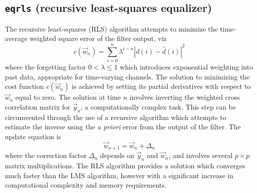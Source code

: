 \subsection{{\tt eqrls} (recursive least-squares equalizer)}
\label{module:equalization:eqrls}
The recursive least-squares (RLS) algorithm attempts to minimize the
time-average weighted square error of the filter output, viz
\begin{equation}
    c(\vec{w}_n) = \sum\limits_{i=0}^{n}{ \lambda^{i-n} \left| d(i)-\hat{d}(i)\right|^2 }
\end{equation}
where the forgetting factor $0<\lambda\leq 1$ which introduces
exponential weighting into past data, appropriate for time-varying
channels.
The solution to minimizing the cost function $c(\vec{w}_n)$ is achieved by
setting its partial derivatives with respect to $\vec{w}_n$ equal to zero.
The solution at time $n$ involves inverting the weighted cross correlation
matrix for $\vec{y}_n$, a computationally complex task.
This step can be circumvented through the use of a recursive algorithm which
attempts to estimate the inverse using the {\it a priori} error from the
output of the filter.
The update equation is
%
\begin{equation}
\label{eqn:equalization:rls_update}
    \vec{w}_{n+1} = \vec{w}_n + \Delta_{n}
\end{equation}
%
where the correction factor $\Delta_{n}$ depends on $\vec{y}_n$ and $\vec{w}_n$,
and involves several $p \times p$ matrix multiplications.
The RLS algorithm provides a solution which converges much faster than the LMS
algorithm, however with a significant increase in computational complexity and
memory requirements.

